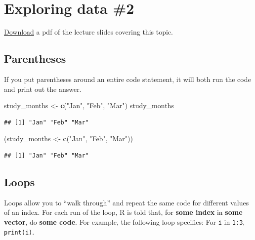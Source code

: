 \documentclass[]{book}
\makeatletter
\newenvironment{Shaded}{\begin{snugshade}}{\end{snugshade}}
\newcommand{\KeywordTok}[1]{\textcolor[rgb]{0.13,0.29,0.53}{\textbf{#1}}}
\newcommand{\StringTok}[1]{\textcolor[rgb]{0.31,0.60,0.02}{#1}}
\newcommand{\NormalTok}[1]{#1}
\newenvironment{kframe}{%
\medskip{}
\setlength{\fboxsep}{.8em}
 \def\at@end@of@kframe{}%
 \ifinner\ifhmode%
  \def\at@end@of@kframe{\end{minipage}}%
  \begin{minipage}{\columnwidth}%
 \fi\fi%
 \def\FrameCommand##1{\hskip\@totalleftmargin \hskip-\fboxsep
 \colorbox{shadecolor}{##1}\hskip-\fboxsep
     \hskip-\linewidth \hskip-\@totalleftmargin \hskip\columnwidth}%
 \MakeFramed {\advance\hsize-\width
   \@totalleftmargin\z@ \linewidth\hsize
   \@setminipage}}%
 {\par\unskip\endMakeFramed%
 \at@end@of@kframe}
\renewenvironment{Shaded}{\begin{kframe}}{\end{kframe}}
\theoremstyle{definition}
\theoremstyle{definition}
\theoremstyle{definition}
\theoremstyle{remark}
\makeatother
\begin{document}
\chapter{Exploring data \#2}\label{exploring-data-2}

\href{https://github.com/geanders/RProgrammingForResearch/raw/master/slides/CourseNotes_Week7.pdf}{Download}
a pdf of the lecture slides covering this topic.

\section{Parentheses}\label{parentheses}

If you put parentheses around an entire code statement, it will both run
the code and print out the answer.

\begin{Shaded}
\begin{Highlighting}[]
\NormalTok{study_months <-}\StringTok{ }\KeywordTok{c}\NormalTok{(}\StringTok{"Jan"}\NormalTok{, }\StringTok{"Feb"}\NormalTok{, }\StringTok{"Mar"}\NormalTok{)}
\NormalTok{study_months}
\end{Highlighting}
\end{Shaded}

\begin{verbatim}
## [1] "Jan" "Feb" "Mar"
\end{verbatim}

\begin{Shaded}
\begin{Highlighting}[]
\NormalTok{(study_months <-}\StringTok{ }\KeywordTok{c}\NormalTok{(}\StringTok{"Jan"}\NormalTok{, }\StringTok{"Feb"}\NormalTok{, }\StringTok{"Mar"}\NormalTok{))}
\end{Highlighting}
\end{Shaded}

\begin{verbatim}
## [1] "Jan" "Feb" "Mar"
\end{verbatim}

\section{Loops}\label{loops}

Loops allow you to ``walk through'' and repeat the same code for
different values of an index. For each run of the loop, R is told that,
for \textbf{some index} in \textbf{some vector}, do \textbf{some code}.
For example, the following loop specifies: For \texttt{i} in
\texttt{1:3}, \texttt{print(i)}.
\end{document}
